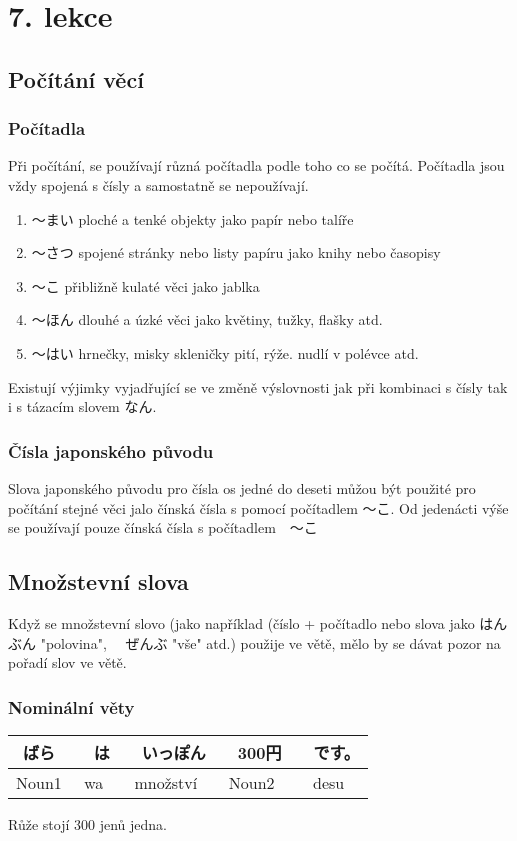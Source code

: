 \section{7. lekce}
\label{sec:lekce_7}
\subsection{Počítání věcí}
\subsubsection{Počítadla}
Při počítání, se používají různá počítadla podle toho co se počítá. Počítadla jsou vždy spojená s čísly a samostatně se nepoužívají.

\begin{enumerate}
\item 〜まい ploché a tenké objekty jako papír nebo talíře
\item 〜さつ spojené stránky nebo listy papíru jako knihy nebo časopisy
\item 〜こ přibližně kulaté věci jako jablka
\item 〜ほん dlouhé a úzké věci jako květiny, tužky, flašky atd.
\item 〜はい hrnečky, misky skleničky pití, rýže. nudlí v polévce atd.
\end{enumerate}

Existují výjimky vyjadřující se ve změně výslovnosti jak při kombinaci s čísly tak i s tázacím slovem なん. 

\subsubsection{Čísla japonského původu}
Slova japonského původu pro čísla os jedné do deseti můžou být použité pro počítání stejné věci jalo čínská čísla s pomocí počítadlem 〜こ. Od jedenácti výše se používají pouze čínská čísla s počítadlem　〜こ

\subsection{Množstevní slova}
Když se množstevní slovo (jako například (číslo + počítadlo nebo slova jako はんぶん "polovina", 　ぜんぶ "vše" atd.) použije ve větě, mělo by se dávat pozor na pořadí slov ve větě.　

\subsubsection{Nominální věty}
\begin{center}
\begin{tabular}{|c|c|c|c|c|}
\hline
ばら&　は&　いっぽん&　300円&　です。\\
\hline
Noun1&wa&množství&Noun2&desu\\
\hline
\end{tabular}
\end{center}
Růže stojí 300 jenů jedna.

